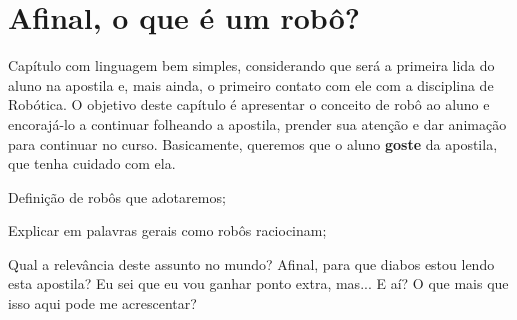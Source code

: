 \chapter{Afinal, o que é um robô?}

Capítulo com linguagem bem simples, considerando que será a primeira lida do aluno na apostila e, mais ainda, o primeiro contato com ele com a disciplina de Robótica. O objetivo deste capítulo é apresentar o conceito de robô ao aluno e encorajá-lo a continuar folheando a apostila, prender sua atenção e dar animação para continuar no curso. Basicamente, queremos que o aluno \textbf{goste} da apostila, que tenha cuidado com ela.

Definição de robôs que adotaremos;

Explicar em palavras gerais como robôs raciocinam;

Qual a relevância deste assunto no mundo? Afinal, para que diabos estou lendo esta apostila? Eu sei que eu vou ganhar ponto extra, mas... E aí? O que mais que isso aqui pode me acrescentar?
